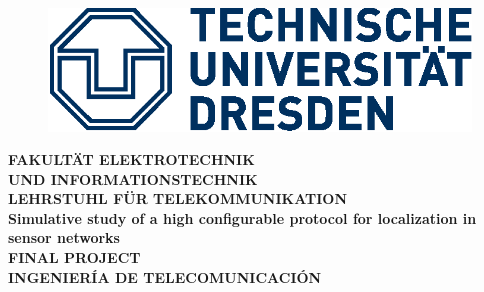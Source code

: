 \begin{figure}[top]
 \begin{center}
  \includegraphics[scale=1]{logo_tud.eps}
 \end{center}
\end{figure}
\begin{center}
 \vspace{0.2cm}
 \Large{\textbf{FAKULT\"AT ELEKTROTECHNIK\\ UND INFORMATIONSTECHNIK}}\\
 \vspace{0.5cm}
 \Large{\textbf{LEHRSTUHL F\"UR TELEKOMMUNIKATION}}\\
 \vspace{3cm}
 \Huge{\textbf{Simulative study of a high configurable protocol for localization in sensor networks}}\\
 \vspace{2cm}
 \Large{\textbf{FINAL PROJECT}}\\
 \vspace{0.5cm}
 \large{\textbf{INGENIER\'IA DE TELECOMUNICACI\'ON}}\\
\end{center}

\vspace{4cm}
\centerline{ }
\vspace{0.2cm}
\centerline{ }
